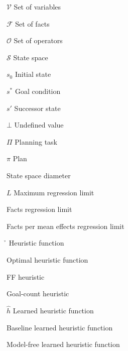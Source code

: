 \begin{listofsymbols}{\hgc}
    \item[$\mathcal{V}$] Set of variables
    \item[$\mathcal{F}$] Set of facts
    \item[$\mathcal{O}$] Set of operators
    \item[$\mathcal{S}$] State space
    \item[$s_0$] Initial state
    \item[$s^*$] Goal condition
    \item[$s'$] Successor state
    \item[$\bot$] Undefined value
    \item[$\Pi$] Planning task
    \item[$\pi$] Plan
    \item[\ssdiameter] State space diameter
    \item[$L$] Maximum regression limit
    \item[\facts] Facts regression limit
    \item[\meanfx] Facts per mean effects regression limit
    \item[\h] Heuristic function
    \item[\hstar] Optimal heuristic function
    \item[\hff] FF heuristic
    \item[\hgc] Goal-count heuristic
    \item[$\hat h$] Learned heuristic function
    \item[\hnnbase] Baseline learned heuristic function
    \item[\hnnnomutex] Model-free learned heuristic function
\end{listofsymbols}
